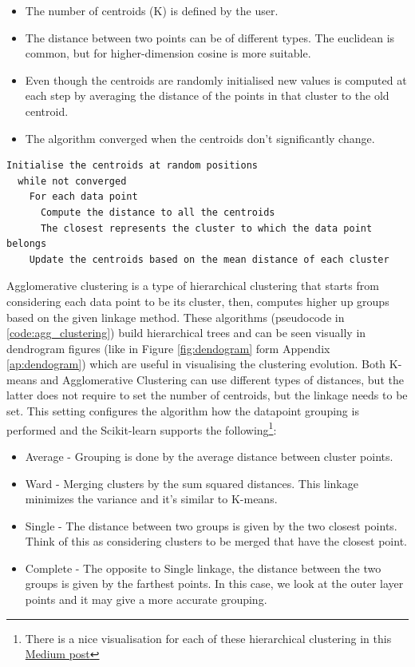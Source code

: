 \begin{itemize}
  \item The number of centroids (K) is defined by the user.
  \item The distance between two points can be of different types. The euclidean is common, but for higher-dimension cosine is more suitable.
  \item Even though the centroids are randomly initialised new values is computed at each step by averaging the distance of the points in that cluster to the old centroid.
  \item The algorithm converged when the centroids don't significantly change.
\end{itemize}

\begin{lstlisting}[caption={K-means pseudocode}, label={code:k-means}]
  Initialise the centroids at random positions
  while not converged 
    For each data point
      Compute the distance to all the centroids
      The closest represents the cluster to which the data point belongs
    Update the centroids based on the mean distance of each cluster
\end{lstlisting} 

Agglomerative clustering is a type of hierarchical clustering that starts from considering each data point to be its cluster, then, computes higher up groups based on the given linkage method. These algorithms (pseudocode in \ref{code:agg_clustering}) build hierarchical trees and can be seen visually in dendrogram figures (like in Figure \ref{fig:dendogram} form Appendix \ref{ap:dendogram}) which are useful in visualising the clustering evolution. Both K-means and Agglomerative Clustering can use different types of distances, but the latter does not require to set the number of centroids, but the linkage needs to be set. This setting configures the algorithm how the datapoint grouping is performed and the Scikit-learn supports the following\footnote{
  There is a nice visualisation for each of these hierarchical clustering in this \href{https://towardsdatascience.com/machine-learning-algorithms-part-12-hierarchical-agglomerative-clustering-example-in-python-1e18e0075019}{Medium post} }:
\begin{itemize}
  \item Average - Grouping is done by the average distance between cluster points.
  \item Ward - Merging clusters by the sum squared distances. This linkage minimizes the variance and it's similar to K-means.
  \item Single - The distance between two groups is given by the two closest points. Think of this as considering clusters to be merged that have the closest point.
  \item Complete - The opposite to Single linkage, the distance between the two groups is given by the farthest points. In this case, we look at the outer layer points and it may give a more accurate grouping.
\end{itemize}



